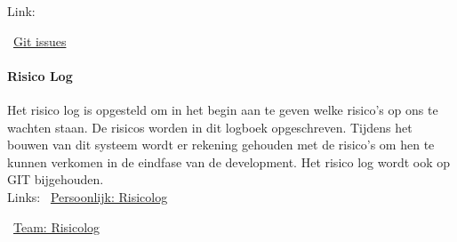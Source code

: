 \documentclass{article}
\begin{document}
Link:

\MVAt~\href{https://github.com/Gewad/Project4Bankalicious/issues}{Git issues}

\paragraph{Risico Log}
Het risico log is opgesteld om in het begin aan te geven
welke risico's op ons te wachten staan.
De risicos worden in dit logboek opgeschreven.
Tijdens het bouwen van dit systeem wordt er rekening gehouden met de risico's
om hen te kunnen verkomen in de eindfase van de development.
Het risico log wordt ook op GIT bijgehouden.\\

Links:
\MVAt~\href{https://github.com/Gewad/Project4Bankalicious/blob/test/opdrachten/opdracht_h}{Persoonlijk: Risicolog}

\MVAt~\href{https://github.com/Gewad/Project4Bankalicious/blob/test/opdrachten/opdracht_h/opdracht_h_teamonderdeel.xlsx}{Team: Risicolog}
\end{document}
